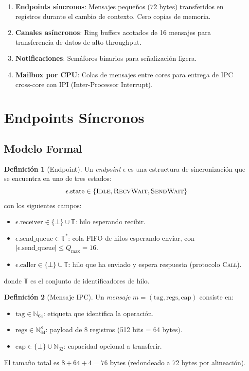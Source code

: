 \documentclass[11pt,twoside,openright]{book}
\theoremstyle{definition}
\newtheorem{definition}{Definición}[chapter]
\theoremstyle{plain}
\theoremstyle{remark}
\begin{document}
\begin{enumerate}
    \item \textbf{Endpoints síncronos}: Mensajes pequeños (72 bytes) transferidos en
          registros durante el cambio de contexto. Cero copias de memoria.
    \item \textbf{Canales asíncronos}: Ring buffers acotados de 16 mensajes para
          transferencia de datos de alto throughput.
    \item \textbf{Notificaciones}: Semáforos binarios para señalización ligera.
    \item \textbf{Mailbox por CPU}: Colas de mensajes entre cores para entrega de IPC
          cross-core con IPI (Inter-Processor Interrupt).
\end{enumerate}

\section{Endpoints Síncronos}

\subsection{Modelo Formal}

\begin{definition}[Endpoint]
\label{def:endpoint}
Un \emph{endpoint} $\epsilon$ es una estructura de sincronización que se encuentra en uno
de tres estados:
\[
    \epsilon.\text{state} \in \{\textsc{Idle}, \textsc{RecvWait}, \textsc{SendWait}\}
\]
con los siguientes campos:
\begin{itemize}
    \item $\epsilon.\text{receiver} \in \{\bot\} \cup \mathbb{T}$: hilo esperando recibir.
    \item $\epsilon.\text{send\_queue} \in \mathbb{T}^*$: cola FIFO de hilos esperando enviar,
          con $|\epsilon.\text{send\_queue}| \leq Q_{\max} = 16$.
    \item $\epsilon.\text{caller} \in \{\bot\} \cup \mathbb{T}$: hilo que ha enviado y
          espera respuesta (protocolo \textsc{Call}).
\end{itemize}
donde $\mathbb{T}$ es el conjunto de identificadores de hilo.
\end{definition}

\begin{definition}[Mensaje IPC]
\label{def:ipc-message}
Un \emph{mensaje} $m = (\text{tag}, \text{regs}, \text{cap})$ consiste en:
\begin{itemize}
    \item $\text{tag} \in \mathbb{N}_{64}$: etiqueta que identifica la operación.
    \item $\text{regs} \in \mathbb{N}_{64}^{8}$: payload de 8 registros (512 bits = 64 bytes).
    \item $\text{cap} \in \{\bot\} \cup \mathbb{N}_{32}$: capacidad opcional a transferir.
\end{itemize}
El tamaño total es $8 + 64 + 4 = 76$ bytes (redondeado a 72 bytes por alineación).
\end{definition}
\end{document}
